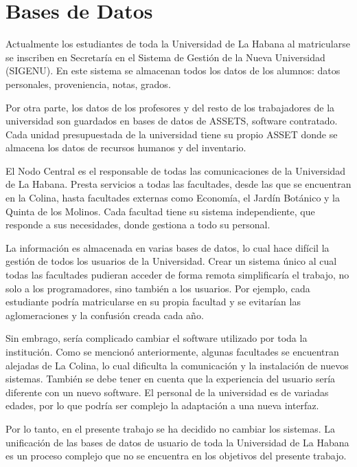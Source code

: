 \section{Bases de Datos} \label{db-layer}

Actualmente los estudiantes de toda la Universidad de La Habana al matricularse se inscriben en Secretaría en el Sistema de Gestión de la Nueva Universidad (SIGENU). En este sistema se almacenan todos los datos de los alumnos: datos personales, proveniencia, notas, grados.

Por otra parte, los datos de los profesores y del resto de los trabajadores de la universidad son guardados en bases de datos de ASSETS, software contratado. Cada unidad presupuestada de la universidad tiene su propio ASSET donde se almacena los datos de recursos humanos y del inventario.

El Nodo Central es el responsable de todas las comunicaciones de la Universidad de La Habana. Presta servicios a todas las facultades, desde las que se encuentran en la Colina, hasta facultades externas como Economía, el Jardín Botánico y la Quinta de los Molinos. Cada facultad tiene su sistema independiente, que responde a sus necesidades, donde gestiona a todo su personal. 

La información es almacenada en varias bases de datos, lo cual hace difícil la gestión de todos los usuarios de la Universidad. Crear un sistema único al cual todas las facultades pudieran acceder de forma remota simplificaría el trabajo, no solo a los programadores, sino también a los usuarios. Por ejemplo, cada estudiante podría matricularse en su propia facultad y se evitarían las aglomeraciones y la confusión creada cada año. 

Sin embrago, sería complicado cambiar el software utilizado por toda la institución. Como se mencionó anteriormente, algunas facultades se encuentran alejadas de La Colina, lo cual dificulta la comunicación y la instalación de nuevos sistemas. También se debe tener en cuenta que la experiencia del usuario sería diferente con un nuevo software. El personal de la universidad es de variadas edades, por lo que podría ser complejo la adaptación a una nueva interfaz.

Por lo tanto, en el presente trabajo se ha decidido no cambiar los sistemas. La unificación de las bases de datos de usuario de toda la Universidad de La Habana es un proceso complejo que no se encuentra en los objetivos del presente trabajo. 

